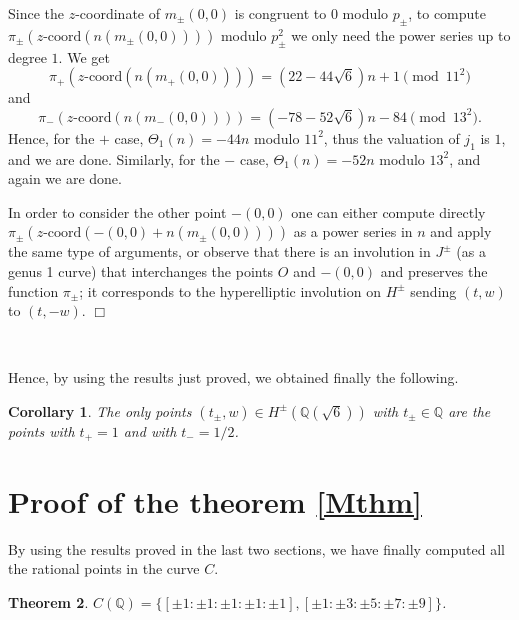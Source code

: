 \documentclass[a4paper,12pt]{amsart}
\newtheorem{thm}{Theorem}
\newtheorem{cor}[thm]{Corollary}
\theoremstyle{remark}
\theoremstyle{definition}
\newenvironment{pf}{\par\noindent{\bf Proof.}\enspace\ignorespaces}{{\hfill $\Box$}\par\par}
\begin{document}
\begin{pf}
Since the $z$-coordinate of $m_{\pm}(0,0)$ is congruent to $0$
modulo $p_{\pm}$, to compute
$\pi_{\pm}(z\mbox{-coord}(n(m_{\pm}(0,0))))$ modulo $p_{\pm}^2$ we
only need the power series up to degree $1$. We get 
$$\pi_{+}(z\mbox{-coord}(n(m_{+}(0,0))))=(22-44\sqrt{6})n + 1 \pmod{11^2}$$
and
$$\pi_{-}(z\mbox{-coord}(n(m_{-}(0,0))))=
(-78-52\sqrt{6})n -84 \pmod{13^2}. $$ Hence, for the $+$ case,
$\Theta_1(n)=-44n$ modulo $11^2$, thus the valuation of $j_1$ is
$1$, and we are done. Similarly, for the $-$ case,
$\Theta_1(n)=-52n$ modulo $13^2$, and again we are done.

In order to consider the other point $-(0,0)$ one can either
compute directly $\pi_{\pm}(z\mbox{-coord}(-(0,0)+n(m_{\pm}(0,0))))$
as a power series in $n$ and apply the same type of arguments, or
observe that there is an involution in $J^{\pm}$ (as a genus 1
curve) that interchanges the points $O$ and $-(0,0)$ and preserves
the function $\pi_{\pm}$; it corresponds to the hyperelliptic
involution on $H^{\pm}$ sending $(t,w)$ to $(t,-w)$.
\end{pf}

\

Hence, by using the results just proved, we obtained finally the
following.

\begin{cor}\label{pointsH}
The only points $(t_{\pm},w)\in H^{\pm}({{\mathbb{Q}}}(\sqrt{6}))$ with $t_\pm \in
{{\mathbb{Q}}}$ are the points with $t_+=1$ and with $t_-=1/2$.
\end{cor}

\section{Proof of the theorem \ref{Mthm}}

By using the results proved in the last two sections, we have
finally computed all the rational points in the curve $C$.

\begin{thm}\label{pointsC}
$C({{\mathbb{Q}}})=\{[\pm1:\pm1:\pm1:\pm1:\pm1],[\pm1:\pm3:\pm5:\pm7:\pm9]\}$.
\end{thm}
\end{document}
